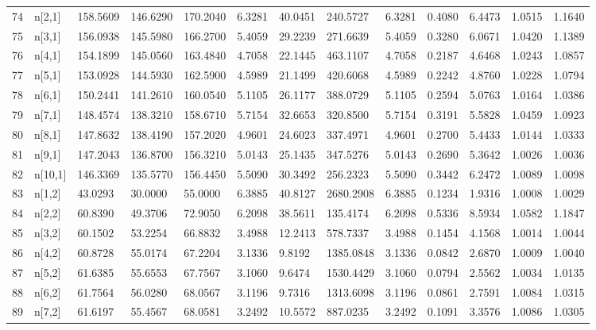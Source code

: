 \begin{table}[ht]
\begin{tabular}{rllllllllllll}
  74 & n[2,1] & 158.5609 & 146.6290 & 170.2040 &  6.3281 &   40.0451 &  240.5727 &  6.3281 & 0.4080 &  6.4473 & 1.0515 & 1.1640 \\ 
  75 & n[3,1] & 156.0938 & 145.5980 & 166.2700 &  5.4059 &   29.2239 &  271.6639 &  5.4059 & 0.3280 &  6.0671 & 1.0420 & 1.1389 \\ 
  76 & n[4,1] & 154.1899 & 145.0560 & 163.4840 &  4.7058 &   22.1445 &  463.1107 &  4.7058 & 0.2187 &  4.6468 & 1.0243 & 1.0857 \\ 
  77 & n[5,1] & 153.0928 & 144.5930 & 162.5900 &  4.5989 &   21.1499 &  420.6068 &  4.5989 & 0.2242 &  4.8760 & 1.0228 & 1.0794 \\ 
  78 & n[6,1] & 150.2441 & 141.2610 & 160.0540 &  5.1105 &   26.1177 &  388.0729 &  5.1105 & 0.2594 &  5.0763 & 1.0164 & 1.0386 \\ 
  79 & n[7,1] & 148.4574 & 138.3210 & 158.6710 &  5.7154 &   32.6653 &  320.8500 &  5.7154 & 0.3191 &  5.5828 & 1.0459 & 1.0923 \\ 
  80 & n[8,1] & 147.8632 & 138.4190 & 157.2020 &  4.9601 &   24.6023 &  337.4971 &  4.9601 & 0.2700 &  5.4433 & 1.0144 & 1.0333 \\ 
  81 & n[9,1] & 147.2043 & 136.8700 & 156.3210 &  5.0143 &   25.1435 &  347.5276 &  5.0143 & 0.2690 &  5.3642 & 1.0026 & 1.0036 \\ 
  82 & n[10,1] & 146.3369 & 135.5770 & 156.4450 &  5.5090 &   30.3492 &  256.2323 &  5.5090 & 0.3442 &  6.2472 & 1.0089 & 1.0098 \\ 
  83 & n[1,2] &  43.0293 &  30.0000 &  55.0000 &  6.3885 &   40.8127 & 2680.2908 &  6.3885 & 0.1234 &  1.9316 & 1.0008 & 1.0029 \\ 
  84 & n[2,2] &  60.8390 &  49.3706 &  72.9050 &  6.2098 &   38.5611 &  135.4174 &  6.2098 & 0.5336 &  8.5934 & 1.0582 & 1.1847 \\ 
  85 & n[3,2] &  60.1502 &  53.2254 &  66.8832 &  3.4988 &   12.2413 &  578.7337 &  3.4988 & 0.1454 &  4.1568 & 1.0014 & 1.0044 \\ 
  86 & n[4,2] &  60.8728 &  55.0174 &  67.2204 &  3.1336 &    9.8192 & 1385.0848 &  3.1336 & 0.0842 &  2.6870 & 1.0009 & 1.0040 \\ 
  87 & n[5,2] &  61.6385 &  55.6553 &  67.7567 &  3.1060 &    9.6474 & 1530.4429 &  3.1060 & 0.0794 &  2.5562 & 1.0034 & 1.0135 \\ 
  88 & n[6,2] &  61.7564 &  56.0280 &  68.0567 &  3.1196 &    9.7316 & 1313.6098 &  3.1196 & 0.0861 &  2.7591 & 1.0084 & 1.0315 \\ 
  89 & n[7,2] &  61.6197 &  55.4567 &  68.0581 &  3.2492 &   10.5572 &  887.0235 &  3.2492 & 0.1091 &  3.3576 & 1.0086 & 1.0305 \\ 

\end{tabular}
\end{table}
